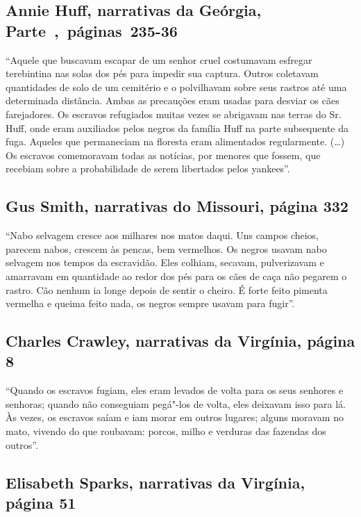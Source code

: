 \subsection{Annie Huff, narrativas da Geórgia, Parte~,~páginas~235-36}
\label{ref150}

``Aquele que buscavam escapar de um senhor cruel costumavam esfregar
terebintina nas solas dos pés para impedir sua captura. Outros coletavam
quantidades de solo de um cemitério e o polvilhavam sobre seus rastros
até uma determinada distância. Ambas as precauções eram usadas para
desviar os cães farejadores. Os escravos refugiados muitas vezes se
abrigavam nas terras do Sr. Huff, onde eram auxiliados pelos negros da
família Huff na parte subsequente da fuga. Aqueles que permaneciam na
floresta eram alimentados regularmente. (\ldots{}) Os escravos
comemoravam todas as notícias, por menores que fossem, que recebiam
sobre a probabilidade de serem libertados pelos yankees''.

\subsection{Gus Smith, narrativas do Missouri, página 332}
\label{ref243}

``Nabo selvagem cresce aos milhares nos matos daqui. Uns campos cheios,
parecem nabos, crescem às pencas, bem vermelhos. Os negros usavam nabo
selvagem nos tempos da escravidão. Eles colhiam, secavam, pulverizavam e
amarravam em quantidade ao redor dos pés para os cães de caça não
pegarem o rastro. Cão nenhum ia longe depois de sentir o cheiro. É forte
feito pimenta vermelha e queima feito nada, os negros sempre usavam para
fugir''.

\subsection{Charles Crawley, narrativas da Virgínia, página 8} \label{ref62}

``Quando os escravos fugiam, eles eram levados de volta para os seus
senhores e senhoras; quando não conseguiam pegá"-los de volta, eles
deixavam isso para lá. Às vezes, os escravos saíam e iam morar em outros
lugares; alguns moravam no mato, vivendo do que roubavam: porcos, milho
e verduras das fazendas dos outros''.

\subsection{Elisabeth Sparks, narrativas da Virgínia, página 51}
\label{ref251} 

